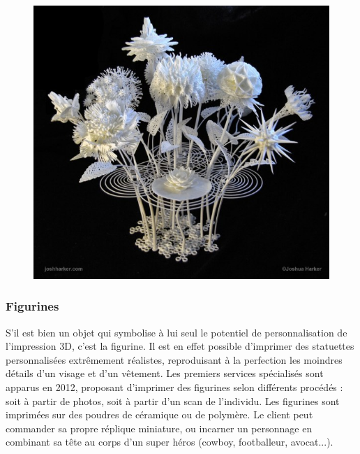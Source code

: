 \documentclass{article}
\begin{document}
\begin{figure}[h!]
\centering
\includegraphics[scale=0.4]{./images/artistique.png}
\end{figure}\hfill

\subsubsection{Figurines}

S'il est bien un objet qui symbolise à lui seul le potentiel de personnalisation de l'impression 3D, c'est la figurine. Il est en effet possible d'imprimer des statuettes personnalisées extrêmement réalistes, reproduisant à la perfection les moindres détails d'un visage et d'un vêtement. Les premiers services spécialisés sont apparus en 2012, proposant d'imprimer des figurines selon différents procédés : soit à partir de photos, soit à partir d'un scan de l'individu. Les figurines sont imprimées sur des poudres de céramique ou de polymère. Le client peut commander sa propre réplique miniature, ou incarner un personnage en combinant sa tête au corps d'un super héros (cowboy, footballeur, avocat...).
\end{document}
